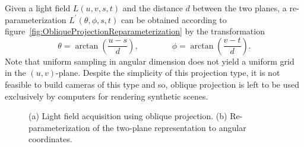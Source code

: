 Given a light field $L(u, v, s, t)$ and the distance $d$ between the two planes, a re-parameterization $L^{\prime}(\theta, \phi, s, t)$ can be obtained according to figure~\ref{fig:ObliqueProjectionReparameterization} by the transformation
\begin{equation}
	\theta = \arctan\left(\frac{u - s}{d}\right), 
	\qquad \qquad
	\phi = \arctan\left(\frac{v - t}{d}\right).
\end{equation}
Note that uniform sampling in angular dimension does not yield a uniform grid in the $(u, v)$-plane.
Despite the simplicity of this projection type, it is not feasible to build cameras of this type and so, oblique projection is left to be used exclusively by computers for rendering synthetic scenes.

\begin{figure}[tb]
	\subcaptionbox{\label{fig:ObliqueProjection}}{}\hfill%
	\subcaptionbox{\label{fig:ObliqueProjectionReparameterization}}{}
	\caption[Parameterization for light fields from oblique projections]
			{(a) Light field acquisition using oblique projection. 
			 (b) Re-parameterization of the two-plane representation to angular coordinates.}
\end{figure}

